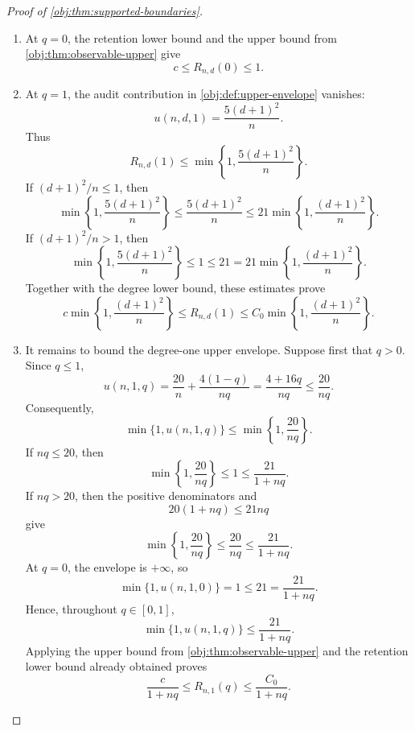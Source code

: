 \documentclass[11pt]{article}
\begin{document}
\begin{proof}[Proof of \cref{obj:thm:supported-boundaries}]
\begin{enumerate}
\item At \(q=0\), the retention lower bound and the upper bound from \cref{obj:thm:observable-upper} give
\[
c\le R_{n,d}(0)\le1.
\]

\item At \(q=1\), the audit contribution in \cref{obj:def:upper-envelope} vanishes:
\[
u(n,d,1)=\frac{5(d+1)^2}{n}.
\]
Thus
\[
R_{n,d}(1)\le
\min\left\{1,\frac{5(d+1)^2}{n}\right\}.
\]
If \((d+1)^2/n\le1\), then
\[
\min\left\{1,\frac{5(d+1)^2}{n}\right\}
\le\frac{5(d+1)^2}{n}
\le
21\min\left\{1,\frac{(d+1)^2}{n}\right\}.
\]
If \((d+1)^2/n>1\), then
\[
\min\left\{1,\frac{5(d+1)^2}{n}\right\}
\le1\le21
=
21\min\left\{1,\frac{(d+1)^2}{n}\right\}.
\]
Together with the degree lower bound, these estimates prove
\[
c\min\left\{1,\frac{(d+1)^2}{n}\right\}
\le R_{n,d}(1)
\le
C_0\min\left\{1,\frac{(d+1)^2}{n}\right\}.
\]

\item It remains to bound the degree-one upper envelope. Suppose first that \(q>0\). Since \(q\le1\),
\[
u(n,1,q)
=
\frac{20}{n}+\frac{4(1-q)}{nq}
=
\frac{4+16q}{nq}
\le\frac{20}{nq}.
\]
Consequently,
\[
\min\{1,u(n,1,q)\}
\le
\min\left\{1,\frac{20}{nq}\right\}.
\]
If \(nq\le20\), then
\[
\min\left\{1,\frac{20}{nq}\right\}
\le1\le\frac{21}{1+nq}.
\]
If \(nq>20\), then the positive denominators and
\[
20(1+nq)\le21nq
\]
give
\[
\min\left\{1,\frac{20}{nq}\right\}
\le\frac{20}{nq}
\le\frac{21}{1+nq}.
\]
At \(q=0\), the envelope is \(+\infty\), so
\[
\min\{1,u(n,1,0)\}=1\le21=\frac{21}{1+nq}.
\]
Hence, throughout \(q\in[0,1]\),
\[
\min\{1,u(n,1,q)\}\le\frac{21}{1+nq}.
\]
Applying the upper bound from \cref{obj:thm:observable-upper} and the retention lower bound already obtained proves
\[
\frac{c}{1+nq}
\le R_{n,1}(q)
\le\frac{C_0}{1+nq}.
\]
\end{enumerate}
\end{proof}
\end{document}
